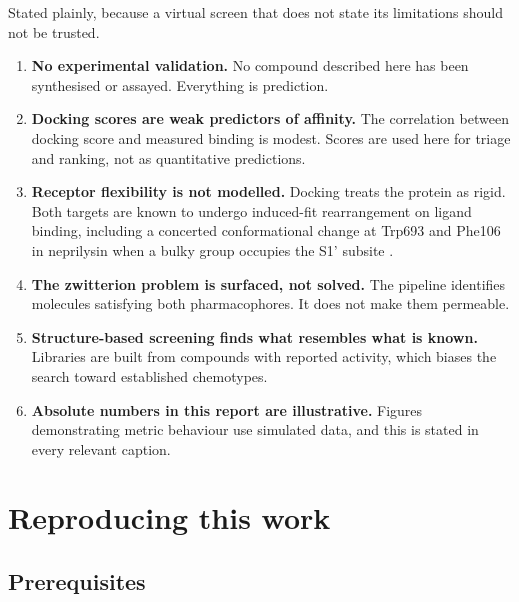 \documentclass[11pt,a4paper]{article}
\begin{document}
Stated plainly, because a virtual screen that does not state its limitations
should not be trusted.

\begin{enumerate}
\item \textbf{No experimental validation.} No compound described here has been
synthesised or assayed. Everything is prediction.

\item \textbf{Docking scores are weak predictors of affinity.} The correlation
between docking score and measured binding is modest. Scores are used here for
triage and ranking, not as quantitative predictions.

\item \textbf{Receptor flexibility is not modelled.} Docking treats the protein
as rigid. Both targets are known to undergo induced-fit rearrangement on ligand
binding, including a concerted conformational change at Trp693 and Phe106 in
neprilysin when a bulky group occupies the S1' subsite \cite{schiering2016}.

\item \textbf{The zwitterion problem is surfaced, not solved.} The pipeline
identifies molecules satisfying both pharmacophores. It does not make them
permeable.

\item \textbf{Structure-based screening finds what resembles what is known.}
Libraries are built from compounds with reported activity, which biases the
search toward established chemotypes.

\item \textbf{Absolute numbers in this report are illustrative.} Figures
demonstrating metric behaviour use simulated data, and this is stated in every
relevant caption.
\end{enumerate}

\section{Reproducing this work}

\subsection{Prerequisites}
\end{document}
